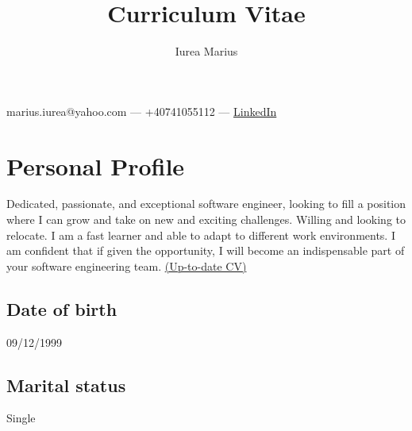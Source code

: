 \documentclass[a4paper,hidelinks,11pt]{article}
\begin{document}
\title{Curriculum Vitae}
\author{Iurea Marius}
\renewcommand{\maketitle}
{\begin{center}
        {\huge\bfseries
        \thetitle

        \theauthor}

        marius.iurea@yahoo.com --- +40741055112 --- \href{https://www.linkedin.com/in/marius-iurea-49b7021b5/}{LinkedIn}

        \end{center}
}



\maketitle

\section{Personal Profile}
Dedicated, passionate, and exceptional software engineer, looking to fill a position where I can grow and take on new and exciting
challenges. Willing and looking to relocate. I am a fast learner and able to adapt to different work environments. I am confident that if given the opportunity, I will become an indispensable part of your software engineering team. \href{https://github.com/IureaMarius/CV}{(Up-to-date CV)}

\subsection{Date of birth} 09/12/1999
\subsection{Marital status} Single
\end{document}
